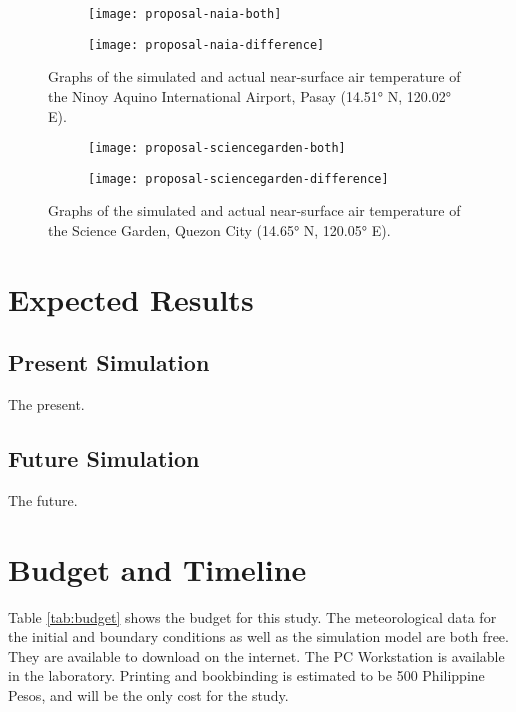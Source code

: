 	\begin{figure}
		\centering
		\begin{subfigure}{\textwidth}
			\texttt{[image: proposal-naia-both]}
		\end{subfigure}
		\begin{subfigure}{\textwidth}
			\texttt{[image: proposal-naia-difference]}
		\end{subfigure}
		\caption{
			Graphs of the simulated and actual near-surface air temperature of the Ninoy Aquino International Airport, Pasay (\ang{14.51} N, \ang{120.02} E).
		}
		\label{fig:proposal-naia-results}
	\end{figure}

	\begin{figure}
		\centering
		\begin{subfigure}{\textwidth}
			\texttt{[image: proposal-sciencegarden-both]}
		\end{subfigure}
		\begin{subfigure}{\textwidth}
			\texttt{[image: proposal-sciencegarden-difference]}
		\end{subfigure}
		\caption{
			Graphs of the simulated and actual near-surface air temperature of the Science Garden, Quezon City (\ang{14.65} N, \ang{120.05} E).
		}
		\label{fig:proposal-sciencegarden-results}
	\end{figure}

\section{Expected Results}
	\subsection{Present Simulation}
		The present.
		
	\subsection{Future Simulation}
		The future.

\section{Budget and Timeline}

	Table \ref{tab:budget} shows the budget for this study.
	The meteorological data for the initial and boundary conditions as well as the simulation model are both free.
	They are available to download on the internet.
	The PC Workstation is available in the laboratory.
	Printing and bookbinding is estimated to be 500 Philippine Pesos,
		and will be the only cost for the study.

